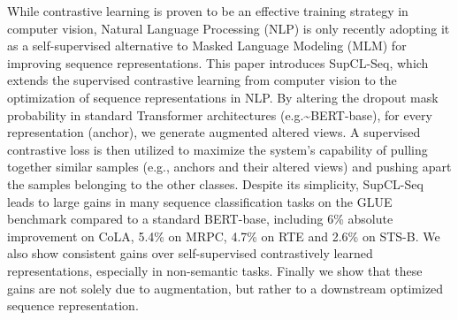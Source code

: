 While contrastive learning is proven to be an effective training strategy in computer vision, Natural Language Processing (NLP) is only recently adopting it as a self-supervised alternative to Masked Language Modeling (MLM) for improving sequence representations. This paper introduces SupCL-Seq, which extends the supervised contrastive learning from computer vision to the optimization of sequence representations in NLP. By altering the dropout mask probability in standard Transformer architectures (e.g.{\textasciitilde}BERT-base), for every representation (anchor), we generate augmented altered views. A supervised contrastive loss is then utilized to maximize the system's capability of pulling together similar samples (e.g., anchors and their altered views) and pushing apart the samples belonging to the other classes. Despite its simplicity, SupCL-Seq leads to large gains in many sequence classification tasks on the GLUE benchmark compared to a standard BERT-base, including 6\% absolute improvement on CoLA, 5.4\% on MRPC, 4.7\% on RTE and 2.6\% on STS-B. We also show consistent gains over self-supervised contrastively learned representations, especially in non-semantic tasks. Finally we show that these gains are not solely due to augmentation, but rather to a downstream optimized sequence representation.
